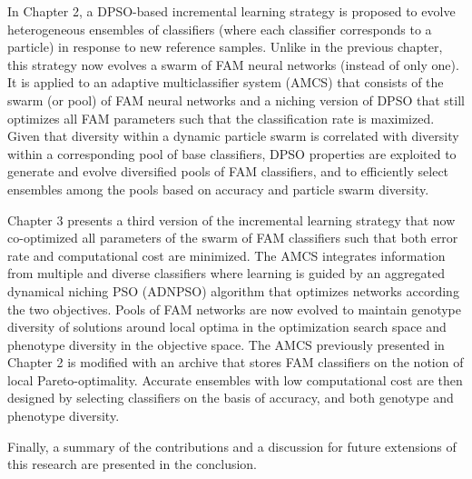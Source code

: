 In Chapter 2, a DPSO-based incremental learning strategy is proposed to evolve heterogeneous ensembles of classifiers (where each classifier corresponds to a particle) in response to new reference samples.
Unlike in the previous chapter, this strategy now evolves a swarm of FAM neural networks (instead of only one).
It is applied to an adaptive multiclassifier system (AMCS) that consists of the swarm (or pool) of FAM neural networks and a niching version of DPSO that still optimizes all FAM parameters such that the classification rate is maximized.
Given that diversity within a dynamic particle swarm is correlated with diversity within a corresponding pool of base classifiers, DPSO properties are exploited to generate and evolve diversified pools of FAM classifiers, and to efficiently select ensembles among the pools based on accuracy and particle swarm diversity.

Chapter 3 presents a third version of the incremental learning strategy that now co-optimized all parameters of the swarm of FAM classifiers such that both error rate and computational cost are minimized. 
The AMCS integrates information from multiple and diverse classifiers where learning is guided by an aggregated dynamical niching PSO (ADNPSO) algorithm that optimizes networks according the two objectives.
Pools of FAM networks are now evolved to maintain genotype diversity of solutions around local optima in the optimization search space and phenotype diversity in the objective space.
The AMCS previously presented in Chapter 2 is modified with an archive that stores FAM classifiers on the notion of local Pareto-optimality.
Accurate ensembles with low computational cost are then designed by selecting classifiers on the basis of accuracy, and both genotype and phenotype diversity.

Finally, a summary of the contributions and a discussion for future extensions of this research are presented in the conclusion.
